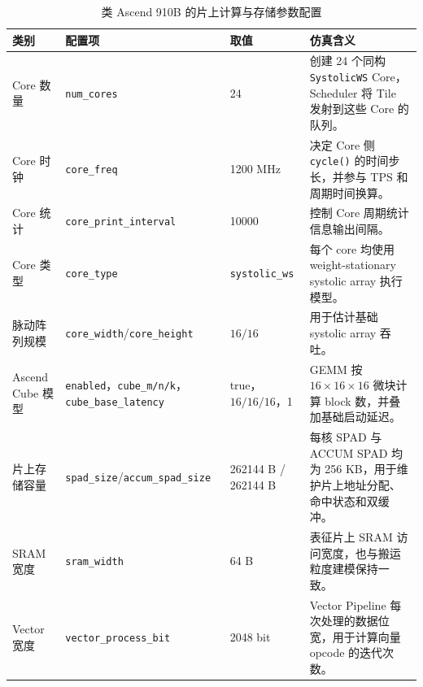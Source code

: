 \documentclass{CjC}
\begin{document}
    \begin{table}[H]
        \centering
        \caption{类 Ascend 910B 的片上计算与存储参数配置}
        \label{tab:ascend910b-onchip-config}
        \footnotesize
        \setlength{\tabcolsep}{3pt}
        \renewcommand{\arraystretch}{1.12}
        \begin{tabular}{p{2.4cm} p{3.2cm} p{2.3cm} p{5.4cm}}
            \toprule
            \textbf{类别} & \textbf{配置项} & \textbf{取值} & \textbf{仿真含义} \\
            \midrule
            Core 数量 & \texttt{num\_cores} & 24 &
            创建 24 个同构 \texttt{SystolicWS} Core，Scheduler 将 Tile 发射到这些 Core 的队列。 \\

            Core 时钟 & \texttt{core\_freq} & 1200 MHz &
            决定 Core 侧 \texttt{cycle()} 的时间步长，并参与 TPS 和周期时间换算。 \\

            Core 统计 & \texttt{core\_print\_interval} & 10000 &
            控制 Core 周期统计信息输出间隔。 \\

            Core 类型 & \texttt{core\_type} & \texttt{systolic\_ws} &
            每个 core 均使用 weight-stationary systolic array 执行模型。 \\

            脉动阵列规模 & \texttt{core\_width}/\texttt{core\_height} & $16/16$ &
            用于估计基础 systolic array 吞吐。 \\

            Ascend Cube 模型 & \texttt{enabled}，\texttt{cube\_m/n/k}，\texttt{cube\_base\_latency} & true，$16/16/16$，1 &
            GEMM 按 $16\times16\times16$ 微块计算 block 数，并叠加基础启动延迟。 \\

            片上存储容量 & \texttt{spad\_size}/\texttt{accum\_spad\_size} & 262144 B / 262144 B &
            每核 SPAD 与 ACCUM SPAD 均为 256 KB，用于维护片上地址分配、命中状态和双缓冲。 \\

            SRAM 宽度 & \texttt{sram\_width} & 64 B &
            表征片上 SRAM 访问宽度，也与搬运粒度建模保持一致。 \\

            Vector 宽度 & \texttt{vector\_process\_bit} & 2048 bit &
            Vector Pipeline 每次处理的数据位宽，用于计算向量 opcode 的迭代次数。 \\


\end{tabular}
\end{table}
\end{document}
